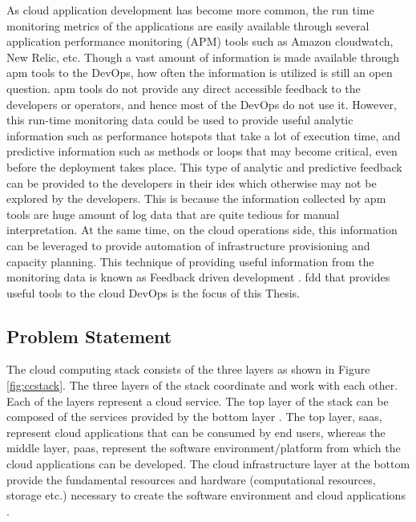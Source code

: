 \documentclass[article,type=msc,colorback,12pt,accentcolor=tud8b,table]{tudthesis}
\begin{document}
	\par As cloud application development has become more common, the run time monitoring metrics of the applications are easily available through several application performance monitoring (APM) tools such as Amazon cloudwatch, New Relic, etc. Though a vast amount of information is made available through \gls{apm} tools to the DevOps, how often the information is utilized is still an open question. \gls{apm} tools do not provide any direct accessible feedback to the developers or operators, and hence most of the DevOps do not use it. However, this run-time monitoring data could be used to provide useful analytic information such as performance hotspots that take a lot of execution time, and predictive information such as methods or loops that may become critical, even before the deployment takes place. This type of analytic and predictive feedback can be provided to the developers in their \gls{ide}s which otherwise may not be explored by the developers. This is because the information collected by \gls{apm} tools are huge amount of log data that are quite tedious for manual interpretation. At the same time, on the cloud operations side, this information can be leveraged to provide automation of infrastructure provisioning and capacity planning. This technique of providing useful information from the monitoring data is known as Feedback driven development \cite{cito2015runtime}. \gls{fdd} that provides useful tools to the cloud DevOps is the focus of this Thesis.	
	
	\subsection{Problem Statement}	
	
The cloud computing stack consists of the three layers as shown in Figure \ref{fig:ccstack}. The three layers of the stack coordinate and work with each other. Each of the layers represent a cloud service. The top layer of the stack can be composed of the services provided by the bottom layer \cite{youseff2008toward}. The top layer, \gls{saas}, represent cloud applications that can be consumed by end users, whereas the middle layer, \gls{paas}, represent the software environment/platform from which the cloud applications can be developed. The cloud infrastructure layer at the bottom provide the fundamental resources and hardware (computational resources, storage etc.) necessary to create the software environment and cloud applications \cite{youseff2008toward}.  
\end{document}
